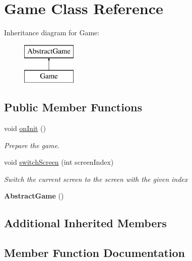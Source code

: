 \hypertarget{class_game}{}\section{Game Class Reference}
\label{class_game}
Inheritance diagram for Game\+:\begin{figure}[H]
\begin{center}
\leavevmode
\includegraphics[height=2.000000cm]{class_game}
\end{center}
\end{figure}
\subsection*{Public Member Functions}
\begin{DoxyCompactItemize}
\item 
void \mbox{\hyperlink{class_game_a91946f348c9334abd083dfebfecdd31d}{on\+Init}} ()
\begin{DoxyCompactList}\small\item\em Prepare the game. \end{DoxyCompactList}\item 
void \mbox{\hyperlink{class_game_a0e1dd146112c54290e11d3e5f0a36fdd}{switch\+Screen}} (int screen\+Index)
\begin{DoxyCompactList}\small\item\em Switch the current screen to the screen with the given index \end{DoxyCompactList}\item 
\mbox{\label{class_game_a0fa2c7df592f68efaecf267f48b9041c}} 
{\bfseries Abstract\+Game} ()
\end{DoxyCompactItemize}
\subsection*{Additional Inherited Members}


\subsection{Member Function Documentation}
\mbox{\label{class_game_a91946f348c9334abd083dfebfecdd31d}} 

